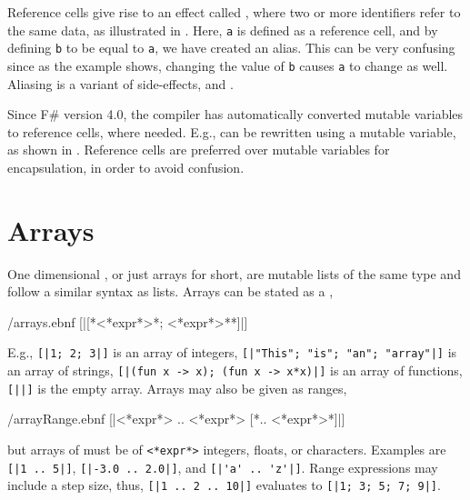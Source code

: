 \documentclass[springer.tex]{subfiles}
\begin{document}
Reference cells give rise to an effect called , where two or more identifiers refer to the same data, as illustrated in .
%
%
Here, \lstinline!a! is defined as a reference cell, and by defining \lstinline!b! to be equal to \lstinline!a!, we have created an alias. This can be very confusing since as the example shows, changing the value of \lstinline!b! causes \lstinline!a! to change as well. Aliasing is a variant of side-effects, and .

Since F\# version 4.0, the compiler has automatically converted mutable variables to reference cells, where needed.  E.g.,  can be rewritten using a mutable variable, as shown in .
% 
% 
Reference cells are preferred over mutable variables for encapsulation, in order to avoid confusion.

\section{Arrays}
\label{sec:arrays}
One dimensional , or just arrays for short, are mutable lists of the same type and follow a similar syntax as lists. Arrays can be stated as a ,
%
\begin{verbatimwrite}{\ebnf/arrays.ebnf}
[|[*<*expr*>{*; <*expr*>*}*]|]
\end{verbatimwrite}
%
E.g., \mbox{\lstinline![|1; 2; 3|]!} is an array of integers, \mbox{\lstinline![|"This"; "is"; "an"; "array"|]!} is an array of strings, \mbox{\lstinline![|(fun x -> x); (fun x -> x*x)|]!} is an array of functions, \lstinline![||]! is the empty array.  Arrays may also be given as ranges,
%
\begin{verbatimwrite}{\ebnf/arrayRange.ebnf}
[|<*expr*> .. <*expr*> [*.. <*expr*>*]|]
\end{verbatimwrite}
%
but arrays of  must be of \lstinline[language=syntax]{<*expr*>} integers, floats, or characters. Examples are \mbox{\lstinline![|1 .. 5|]!}, \mbox{\lstinline![|-3.0 .. 2.0|]!}, and \mbox{\lstinline![|'a' .. 'z'|]!}. Range expressions may include a step size, thus, \mbox{\lstinline![|1 .. 2 .. 10|]!} evaluates to \mbox{\lstinline![|1; 3; 5; 7; 9|]!}.
\end{document}
